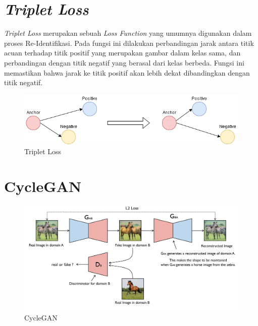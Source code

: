 \section{\textit{Triplet Loss}}
\vspace{1ex}

\par \textit{Triplet Loss} merupakan sebuah \textit{Loss Function} yang umumnya digunakan dalam proses Re-Identifikasi. Pada fungsi ini dilakukan perbandingan jarak antara titik acuan terhadap titik positif yang merupakan gambar dalam kelas sama, dan perbandingan dengan titik negatif yang berasal dari kelas berbeda. Fungsi ini memastikan bahwa jarak ke titik positif akan lebih dekat dibandingkan dengan titik negatif.

\begin{figure}[h!]
	\centering
	\includegraphics[scale=0.4]{img/TripletLoss.png}
	\caption{Triplet Loss}
	\label{fig:Triplet}
\end{figure}

\section{CycleGAN}
\vspace{1ex}

\begin{figure}  [!htb]
	        \captionsetup{justification=centering}
	        \includegraphics[scale=0.2]{img/cyclegan.png}
	        \caption{CycleGAN}
	        \label{fig: 3_18}
\end{figure}

